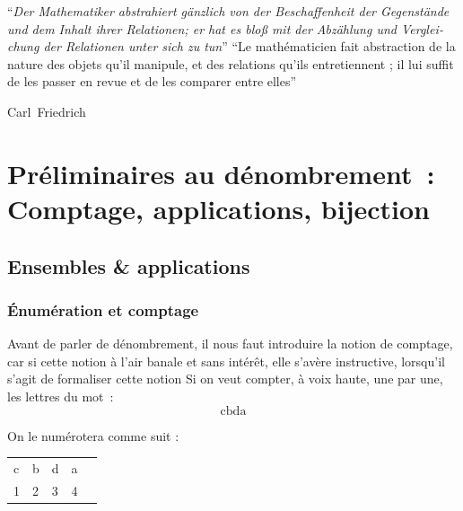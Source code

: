 \documentclass[a4paper,french,final]{memoir}
\begin{document}
\epigraph{\foreignlanguage{german}{\enquote{\itshape Der Mathematiker abstrahiert gänzlich von der Beschaffenheit der Gegenstände und dem Inhalt ihrer Relationen; er hat es bloß mit der Abzählung und Vergleichung der Relationen unter sich zu tun}}\newline\newline
\enquote{Le mathématicien fait abstraction de la nature des objets qu'il manipule, et des relations qu'ils entretiennent ; il lui suffit de les passer en revue et de les comparer entre elles}
}{Carl~Friedrich~~\cite{gauss_cite}}
\mainmatter
\part{Préliminaires au dénombrement~: Comptage, applications, bijection}
\chapter{Ensembles \& applications}
\section{\'Enumération et comptage}
Avant de parler de dénombrement, il nous faut introduire la notion de comptage, car si cette notion à l'air banale et sans intérêt, elle s'avère instructive, lorsqu'il s'agit de formaliser cette notion 
Si on veut compter, à voix haute, une par une, les lettres du mot~:\[\text{cbda}\]

On le numérotera comme suit : 
\begin{table}[h]
\centering
\begin{tabular}{lllll}
c & b & d & a &  \\
1 & 2 & 3 & 4 &  
\end{tabular}
\end{table}
\end{document}
